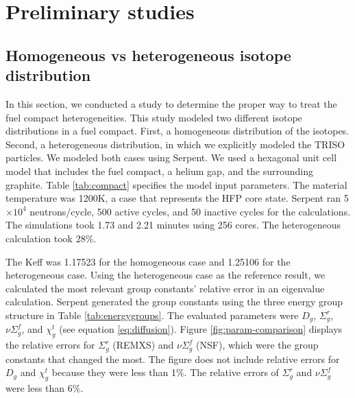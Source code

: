 \documentclass[11pt,letterpaper]{article}
\begin{document}
\section{Preliminary studies}

\subsection{Homogeneous vs heterogeneous isotope distribution}

In this section, we conducted a study to determine the proper way to treat the fuel compact heterogeneities.
This study modeled two different isotope distributions in a fuel compact.
First, a homogeneous distribution of the isotopes.
Second, a heterogeneous distribution, in which we explicitly modeled the TRISO particles.
We modeled both cases using Serpent.
We used a hexagonal unit cell model that includes the fuel compact, a helium gap, and the surrounding graphite.
Table \ref{tab:compact} specifies the model input parameters.
The material temperature was 1200K, a case that represents the \gls{HFP} core state.
Serpent ran 5$\times 10^4$ neutrons/cycle, 500 active cycles, and 50 inactive cycles for the calculations.
The simulations took 1.73 and 2.21 minutes using 256 cores.
The heterogeneous calculation took 28$\%$.

The \gls{Keff} was 1.17523 for the homogeneous case and 1.25106 for the heterogeneous case.
Using the heterogeneous case as the reference result, we calculated the most relevant group constants' relative error in an eigenvalue calculation.
Serpent generated the group constants using the three energy group structure in Table \ref{tab:energygroups}.
The evaluated parameters were $D_g$, $\Sigma^r_g$, $\nu\Sigma^f_g$, and $\chi^t_g$ (see equation \ref{eq:diffusion}).
Figure \ref{fig:param-comparison} displays the relative errors for $\Sigma^r_g$ (REMXS) and $\nu\Sigma^f_g$ (NSF), which were the group constants that changed the most.
The figure does not include relative errors for $D_g$ and $\chi^t_g$ because they were less than 1$\%$.
The relative errors of $\Sigma^r_g$ and $\nu\Sigma^f_g$ were less than 6$\%$.

\end{document}
